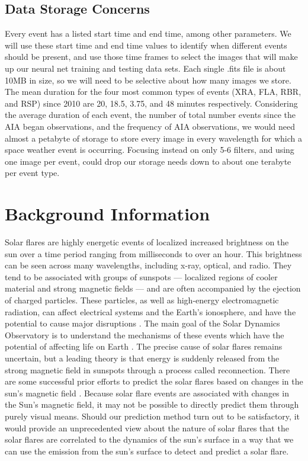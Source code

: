 \documentclass[12pt, letterpaper]{article}
\begin{document}
\subsection*{Data Storage Concerns}
Every event has a listed start time and end time, among other parameters. We will use these start time and end time values to identify when different events should be present, and use those time frames to select the images that will make up our neural net training and testing data sets. Each single .fits file is about 10MB in size, so we will need to be selective about how many images we store. The mean duration for the four most common types of events (XRA, FLA, RBR, and RSP) since 2010 are 20, 18.5, 3.75, and 48 minutes respectively. Considering the average duration of each event, the number of total number events since the AIA began observations, and the frequency of AIA observations, we would need almost a petabyte of storage to store every image in every wavelength for which a space weather event is occurring. Focusing instead on only 5-6 filters, and using one image per event, could drop our storage needs down to about one terabyte per event type.

\section*{Background Information}

Solar flares are highly energetic events of localized increased brightness on the sun over a time period ranging from milliseconds to over an hour. This brightness can be seen across many wavelengths, including x-ray, optical, and radio. They tend to be associated with groups of sunspots — localized regions of cooler material and strong magnetic fields — and are often accompanied by the ejection of charged particles. These particles, as well as high-energy electromagnetic radiation, can affect electrical systems and the Earth’s ionosphere, and have the potential to cause major disruptions \cite{BOB}. The main goal of the Solar Dynamics Observatory is to understand the mechanisms of these events which have the potential of affecting life on Earth \cite{Pesnell2012}. The precise cause of solar flares remains uncertain, but a leading theory is that energy is suddenly released from the strong magnetic field in sunspots through a process called reconnection. There are some successful prior efforts to predict the solar flares based on changes in the sun’s magnetic field \cite{Raboonik2016}. Because solar flare events are associated with changes in the Sun’s magnetic field, it may not be possible to directly predict them through purely visual means. Should our prediction method turn out to be satisfactory, it would provide an unprecedented view about the nature of solar flares that the solar flares are correlated to the dynamics of the sun's surface in a way that we can use the emission from the sun's surface to detect and predict a solar flare.
\end{document}
